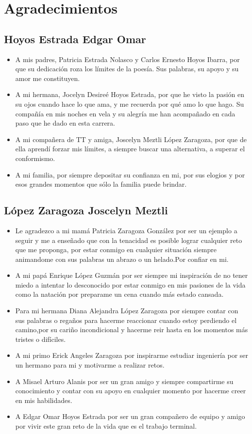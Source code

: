 \section{Agradecimientos}
\subsection{Hoyos Estrada Edgar Omar}
\begin{itemize}
    \item A mis padres, Patricia Estrada Nolasco y Carlos Ernesto Hoyos Ibarra, por que su dedicación 
    roza los límites de la poesía. Sus palabras, su apoyo y su amor me constituyen.
    \item A mi hermana, Jocelyn Desireé Hoyos Estrada, por que he visto la pasión en su ojos cuando 
    hace lo que ama, y me recuerda por qué amo lo que hago. Su compañía en mis noches en vela y su 
    alegría me han acompañado en cada paso que he dado en esta carrera.
    \item A mi compañera de TT y amiga, Joscelyn Meztli López Zaragoza, por que de ella aprendí forzar 
    mis límites, a siempre buscar una alternativa, a superar el conformismo.
    \item A mi familia, por siempre depositar su confianza en mi, por sus elogios y por esos grandes 
    momentos que sólo la familia puede brindar.
\end{itemize}
\subsection{López Zaragoza Joscelyn Meztli}
\begin{itemize}
\item Le agradezco a mi mamá  Patricia Zaragoza González por ser un ejemplo a seguir y me a enseñado
que con la tenacidad es posible lograr cualquier reto que me proponga,
por estar conmigo en cualquier situación siempre animandome con sus palabras
un abrazo o un helado.Por confiar en mi.
\item A mi papá  Enrique López Guzmán por ser siempre mi inspiración de no 
tener miedo a intentar lo desconocido por estar conmigo en mis pasiones
de la vida como la natación por preparame un cena cuando más estado cansada.
\item  Para mi hermana Diana Alejandra López Zaragoza por siempre contar con sus palabras
o regaños para hacerme reaccionar cuando estoy perdiendo el camino,por su cariño incondicional
y hacerme reir hasta en los momentos más tristes o difíciles.
\item A mi primo Erick Angeles Zaragoza por inspirarme estudiar ingeniería por ser un hermano para mi
y motivarme a realizar retos.
\item A Misael Arturo Alanis por ser un gran amigo y siempre compartirme su conocimiento y contar
con su apoyo en cualquier momento por hacerme creer en mis habilidades.
\item  A Edgar Omar Hoyos Estrada por ser un gran compañero de equipo y amigo por vivir este
gran reto de la vida que es el trabajo terminal.
\end{itemize}

